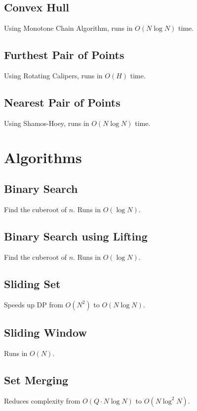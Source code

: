 \documentclass{article}
\begin{document}
\subsection{Convex Hull}
Using Monotone Chain Algorithm, runs in $O(N \log N)$ time.


\subsection{Furthest Pair of Points}
Using Rotating Calipers, runs in $O(H)$ time.


\subsection{Nearest Pair of Points}
Using Shamos-Hoey, runs in $O(N \log N)$ time.


\section{Algorithms}

\subsection{Binary Search}
Find the cuberoot of $n$. Runs in $O(\log{N})$.


\subsection{Binary Search using Lifting}
Find the cuberoot of $n$. Runs in $O(\log{N})$.


\subsection{Sliding Set}
Speeds up DP from $O(N^2)$ to $O(N \log{N})$.


\subsection{Sliding Window}
Runs in $O(N)$.


\subsection{Set Merging}
Reduces complexity from $O(Q \cdot N \log N)$ to $O(N \log^2 N)$.

\end{document}

